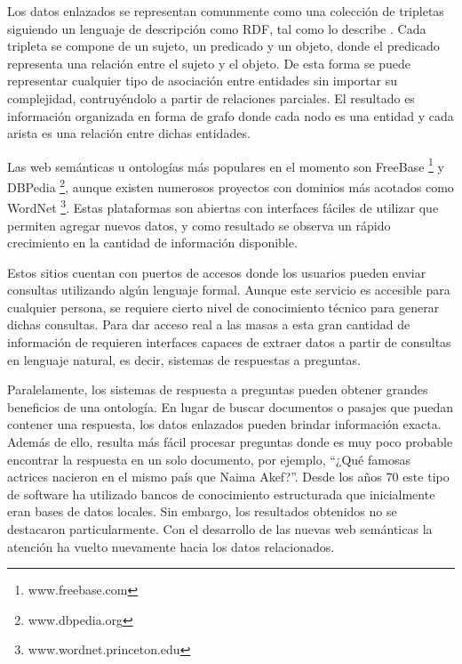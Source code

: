 Los datos enlazados se representan comunmente como una colección de tripletas siguiendo un lenguaje de descripción como RDF, tal como lo describe \citet{brickleyRDF}. Cada tripleta se compone de un sujeto, un predicado y un objeto, donde el predicado representa una relación entre el sujeto y el objeto. De esta forma se puede representar cualquier tipo de asociación entre entidades sin importar su complejidad, contruyéndolo a partir de relaciones parciales. El resultado es información organizada en forma de grafo donde cada nodo es una entidad y cada arista es una relación entre dichas entidades.

Las web semánticas u ontologías más populares en el momento son FreeBase \footnote{www.freebase.com} y DBPedia \footnote{www.dbpedia.org}, aunque existen numerosos proyectos con dominios más acotados como WordNet \footnote{www.wordnet.princeton.edu}. Estas plataformas son abiertas con interfaces fáciles de utilizar que permiten agregar nuevos datos, y como resultado se observa un rápido crecimiento en la cantidad de información disponible.

Estos sitios cuentan con puertos de accesos donde los usuarios pueden enviar consultas utilizando algún lenguaje formal. Aunque este servicio es accesible para cualquier persona, se requiere cierto nivel de conocimiento técnico para generar dichas consultas. Para dar acceso real a las masas a esta gran cantidad de información de requieren interfaces capaces de extraer datos a partir de consultas en lenguaje natural, es decir, sistemas de respuestas a preguntas.

Paralelamente, los sistemas de respuesta a preguntas pueden obtener grandes beneficios de una ontología. En lugar de buscar documentos o pasajes que puedan contener una respuesta, los datos enlazados pueden brindar información exacta. Además de ello, resulta más fácil procesar preguntas donde es muy poco probable encontrar la respuesta en un solo documento, por ejemplo, ``¿Qué famosas actrices nacieron en el mismo país que Naima Akef?''. Desde los años 70 este tipo de software ha utilizado bancos de conocimiento estructurada que inicialmente eran bases de datos locales. Sin embargo, los resultados obtenidos no se destacaron particularmente. Con el desarrollo de las nuevas web semánticas la atención ha vuelto nuevamente hacia los datos relacionados.

